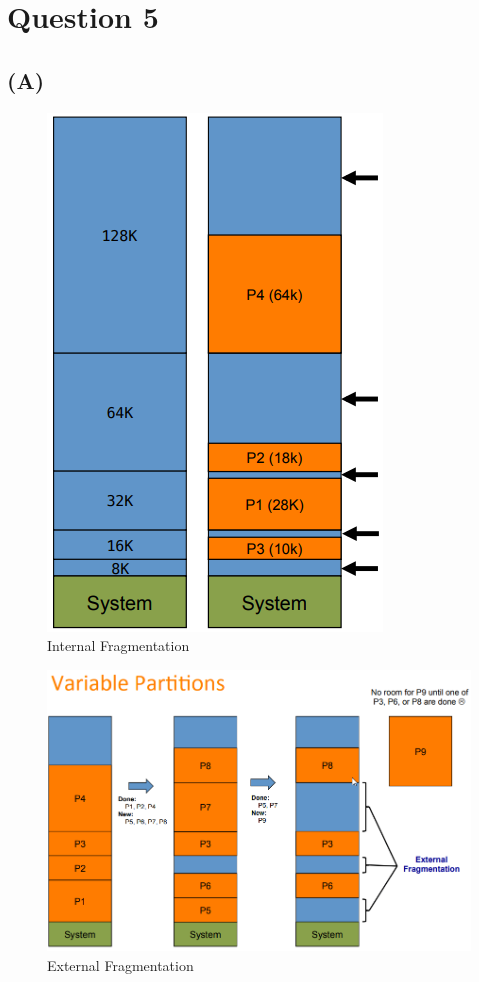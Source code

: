 \documentclass[12pt]{article}
\begin{document}
	\section*{Question 5}	
	\subsection*{(A)}
	\begin{figure}
		\centering
		\includegraphics[width=0.3\columnwidth]{internal-fragmentation}
		\caption{Internal Fragmentation}
		\label{int-frag}
	\end{figure}
	
	\begin{figure}
		\centering
		\includegraphics[width=0.8\columnwidth]{external-fragmentation}
		\caption{External Fragmentation}
		\label{ext-frag}
	\end{figure}
\end{document}
